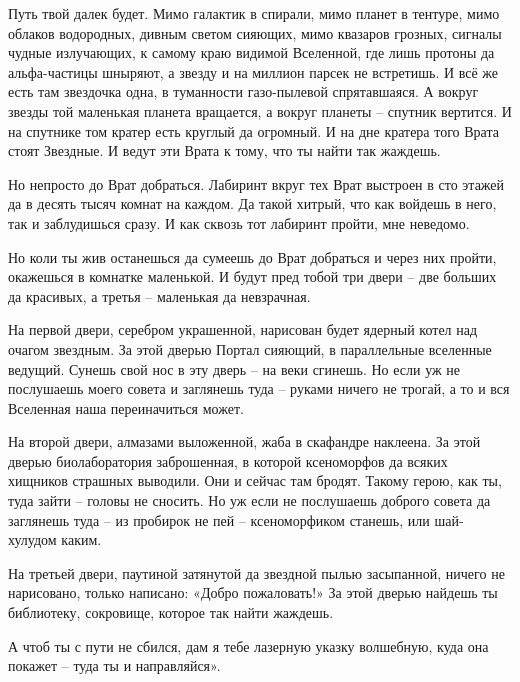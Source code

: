 \documentclass[ebook,oneside,final,openright]{memoir}
\begin{document}
\par
Путь твой далек будет. Мимо галактик в спирали, мимо планет в тентуре, мимо облаков водородных, дивным светом сияющих, мимо квазаров грозных, сигналы чудные излучающих, к самому краю видимой Вселенной, где лишь протоны да альфа-частицы шныряют, а звезду и на миллион парсек не встретишь. И всё же есть там звездочка одна, в туманности газо-пылевой спрятавшаяся. А вокруг звезды той маленькая планета вращается, а вокруг планеты – спутник вертится. И на спутнике том кратер есть круглый да огромный. И на дне кратера того Врата стоят Звездные. И ведут эти Врата к тому, что ты найти так жаждешь.\par
\par
Но непросто до Врат добраться. Лабиринт вкруг тех Врат выстроен в сто этажей да в десять тысяч комнат на каждом. Да такой хитрый, что как войдешь в него, так и заблудишься сразу. И как сквозь тот лабиринт пройти, мне неведомо.\par
\par
Но коли ты жив останешься да сумеешь до Врат добраться и через них пройти, окажешься в комнатке маленькой. И будут пред тобой три двери – две больших да красивых, а третья – маленькая да невзрачная.\par
\par
На первой двери, серебром украшенной, нарисован будет ядерный котел над очагом звездным. За этой дверью Портал сияющий, в параллельные вселенные ведущий. Сунешь свой нос в эту дверь – на веки сгинешь. Но если уж не послушаешь моего совета и заглянешь туда – руками ничего не трогай, а то и вся Вселенная наша переиначиться может.\par
\par
На второй двери, алмазами выложенной, жаба в скафандре наклеена. За этой дверью биолаборатория заброшенная, в которой ксеноморфов да всяких хищников страшных выводили. Они и сейчас там бродят. Такому герою, как ты, туда зайти – головы не сносить. Но уж если не послушаешь доброго совета да заглянешь туда – из пробирок не пей – ксеноморфиком станешь, или шай-хулудом каким.\par
\par
На третьей двери, паутиной затянутой да звездной пылью засыпанной, ничего не нарисовано, только написано: «Добро пожаловать!» За этой дверью найдешь ты библиотеку, сокровище, которое так найти жаждешь.\par
\par
А чтоб ты с пути не сбился, дам я тебе лазерную указку волшебную, куда она покажет – туда ты и направляйся».\par
\end{document}
